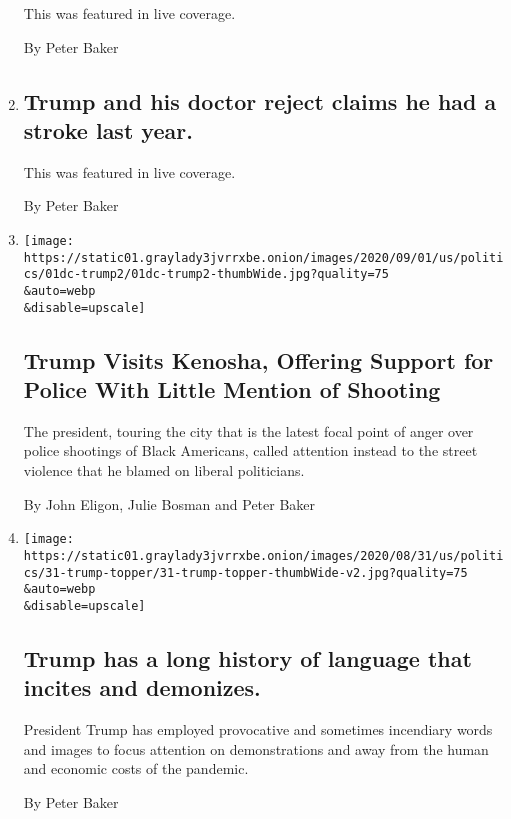 \begin{enumerate}
  This was featured in live coverage.

  By Peter Baker
\item
  \href{/live/2020/09/01/us/trump-vs-biden/trump-and-his-doctor-reject-claims-he-had-a-stroke-last-year}{}

  \hypertarget{trump-and-his-doctor-reject-claims-he-had-a-stroke-last-year}{%
  \subsection{Trump and his doctor reject claims he had a stroke last
  year.}\label{trump-and-his-doctor-reject-claims-he-had-a-stroke-last-year}}

  This was featured in live coverage.

  By Peter Baker
\item
  \href{/2020/09/01/us/politics/trump-conspiracy-theory-thugs-plane.html}{}

  \texttt{[image: https://static01.graylady3jvrrxbe.onion/images/2020/09/01/us/politics/01dc-trump2/01dc-trump2-thumbWide.jpg?quality=75\\\&auto=webp\\\&disable=upscale]}

  \hypertarget{trump-visits-kenosha-offering-support-for-police-with-little-mention-of-shooting}{%
  \subsection{Trump Visits Kenosha, Offering Support for Police With
  Little Mention of
  Shooting}\label{trump-visits-kenosha-offering-support-for-police-with-little-mention-of-shooting}}

  The president, touring the city that is the latest focal point of
  anger over police shootings of Black Americans, called attention
  instead to the street violence that he blamed on liberal politicians.

  By John Eligon, Julie Bosman and Peter Baker
\item
  \href{/2020/09/01/us/elections/trump-has-a-long-history-of-language-that-incites-and-demonizes.html}{}

  \texttt{[image: https://static01.graylady3jvrrxbe.onion/images/2020/08/31/us/politics/31-trump-topper/31-trump-topper-thumbWide-v2.jpg?quality=75\\\&auto=webp\\\&disable=upscale]}

  \hypertarget{trump-has-a-long-history-of-language-that-incites-and-demonizes}{%
  \subsection{Trump has a long history of language that incites and
  demonizes.}\label{trump-has-a-long-history-of-language-that-incites-and-demonizes}}

  President Trump has employed provocative and sometimes incendiary
  words and images to focus attention on demonstrations and away from
  the human and economic costs of the pandemic.

  By Peter Baker
\end{enumerate}


